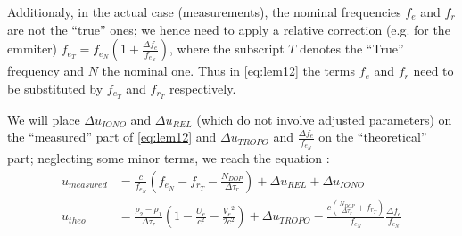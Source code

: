 Additionaly, in the actual case (measurements), the nominal frequencies \(f_e\) and \(f_r\) 
are not the ``true'' ones; we hence need to apply a relative correction (e.g. for the 
emmiter) \(f_{e_T} = f_{e_N} (1 + \frac{\Delta f_e}{f_{e_N}})\), where the subscript \(T\) 
denotes the ``True'' frequency and \(N\) the nominal one. Thus in \ref{eq:lem12} the 
terms \(f_e\) and \(f_r\) need to be substituted by \(f_{e_T}\) and \(f_{r_T}\) respectively.

We will place \(\Delta u_{IONO}\) and \(\Delta u_{REL}\) (which do not involve adjusted parameters) 
on the ``measured'' part of \ref{eq:lem12} and \(\Delta u_{TROPO}\) and \(\frac{\Delta f_e}{f_{e_N}}\) 
on the ``theoretical'' part; neglecting some minor terms, we reach the equation \cite{lemoine-2016}:
\begin{subequations} \label{eq:lem13}
    \begin{align}
        u_{measured} & = \frac{c}{f_{e_N}} (f_{e_N} - f_{r_T} -
          \frac{N_{DOP}}{\Delta\tau_r}) + \Delta u_{REL} + 
          \Delta u_{IONO} \label{eq:lem13a} \\
        u_{theo} &= \frac{\rho_2 - \rho_1}{\Delta\tau_r} 
          (1- \frac{U_e}{c^2} - \frac{{V_e}^2}{2 c^2}) + 
          \Delta u_{TROPO} - \frac{c(\frac{N_{DOP}}{\Delta\tau_r} + 
          f_{r_T})}{f_{e_N}} \frac{\Delta f_e}{f_{e_N}} \label{eq:lem13b}
    \end{align}
\end{subequations}

